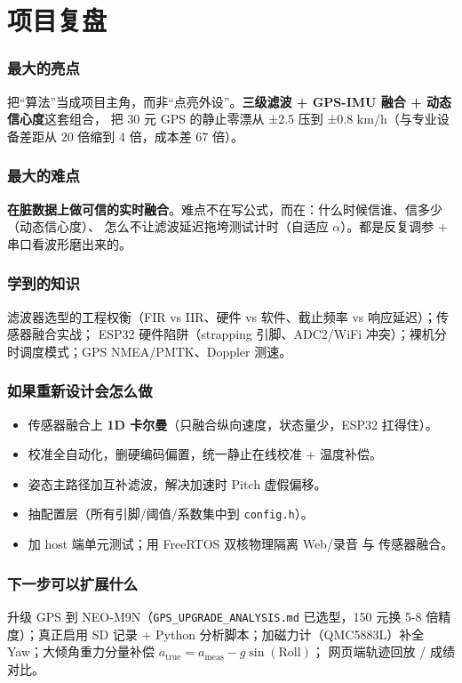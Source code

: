 \documentclass[UTF8,11pt,a4paper]{ctexart}
\begin{document}
\section{项目复盘}
\subsubsection{最大的亮点}
把“算法”当成项目主角，而非“点亮外设”。\textbf{三级滤波 + GPS-IMU 融合 + 动态信心度}这套组合，
把 30 元 GPS 的静止零漂从 ±2.5 压到 ±0.8 km/h（与专业设备差距从 20 倍缩到 4 倍，成本差 67 倍）。

\subsubsection{最大的难点}
\textbf{在脏数据上做可信的实时融合}。难点不在写公式，而在：什么时候信谁、信多少（动态信心度）、
怎么不让滤波延迟拖垮测试计时（自适应 \(\alpha\)）。都是反复调参 + 串口看波形磨出来的。

\subsubsection{学到的知识}
滤波器选型的工程权衡（FIR vs IIR、硬件 vs 软件、截止频率 vs 响应延迟）；传感器融合实战；
ESP32 硬件陷阱（strapping 引脚、ADC2/WiFi 冲突）；裸机分时调度模式；GPS NMEA/PMTK、Doppler 测速。

\subsubsection{如果重新设计会怎么做}
\begin{itemize}
  \item 传感器融合上 \textbf{1D 卡尔曼}（只融合纵向速度，状态量少，ESP32 扛得住）。
  \item 校准全自动化，删硬编码偏置，统一静止在线校准 + 温度补偿。
  \item 姿态主路径加互补滤波，解决加速时 Pitch 虚假偏移。
  \item 抽配置层（所有引脚/阈值/系数集中到 \texttt{config.h}）。
  \item 加 host 端单元测试；用 FreeRTOS 双核物理隔离 Web/录音 与 传感器融合。
\end{itemize}

\subsubsection{下一步可以扩展什么}
升级 GPS 到 NEO-M9N（\texttt{GPS\_UPGRADE\_ANALYSIS.md} 已选型，150 元换 5-8 倍精度）；真正启用 SD 记录 +
Python 分析脚本；加磁力计（QMC5883L）补全 Yaw；大倾角重力分量补偿 $a_{\mathrm{true}}=a_{\mathrm{meas}}-g\sin(\mathrm{Roll})$；
网页端轨迹回放 / 成绩对比。
\end{document}
